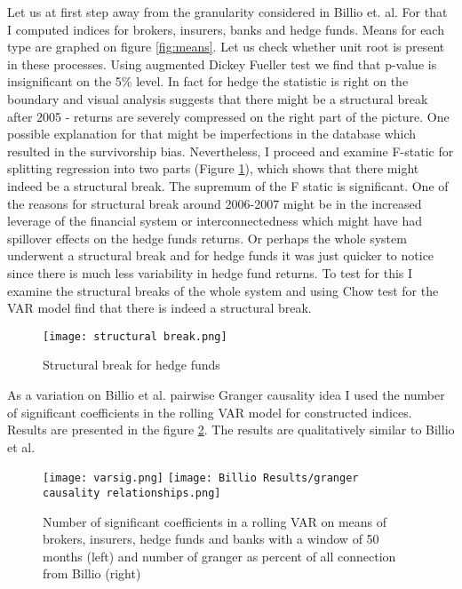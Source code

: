 \documentclass[preprint,pre,floats,aps,amsmath,amssymb]{revtex4}
\begin{document}
Let us at first step away from the granularity considered in Billio et. al. For that I computed indices for brokers, insurers, banks and hedge funds. Means for each type are graphed on figure \ref{fig:means}. Let us check whether unit root is present in these processes.  Using augmented Dickey Fueller test we find that p-value is insignificant on the 5\% level. In fact for hedge the statistic is right on the boundary and visual analysis suggests that there might be a structural break after 2005 -  returns are severely compressed on the right part of the picture. One possible explanation for that might be imperfections in the database which resulted in the survivorship bias. Nevertheless, I proceed and examine F-static for splitting regression into two parts (Figure \ref{fig:hf_break}), which shows that there might indeed be a structural break. The supremum of the F static is significant.  One of the reasons for structural break around 2006-2007 might be in the increased leverage of the financial system or interconnectedness which might have had spillover effects on the hedge funds returns. Or perhaps the whole system underwent a structural break and for hedge funds it was just quicker to notice since there is much less variability in hedge fund returns. To test for this I examine the structural breaks of the whole system and using Chow test for the VAR model find that there is indeed a structural break. 


\begin{figure}[ht]
\texttt{[image: structural break.png]}

\caption{Structural break for hedge funds }
\label{fig:hf_break}
\end{figure}

As a variation on Billio et al. pairwise Granger causality idea I used the number of significant coefficients in the rolling VAR model for constructed indices. Results are presented in the figure \ref{fig:signVAR}. The results are  qualitatively similar to Billio et al. 

\begin{figure}[ht]
\texttt{[image: varsig.png]}
\texttt{[image: Billio Results/granger causality relationships.png]}

\caption{Number of significant coefficients in a rolling VAR on means of brokers, insurers, hedge funds and banks with a window of 50 months (left) and number of granger as percent of all connection from Billio (right)}
\label{fig:signVAR}
\end{figure}
\end{document}
